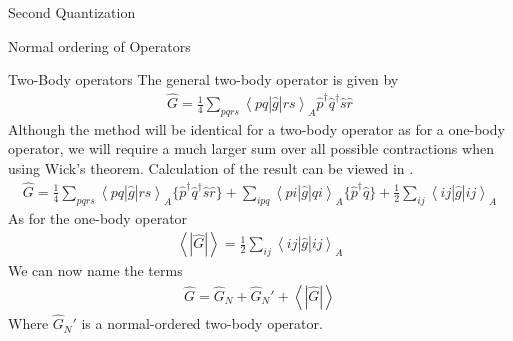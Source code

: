 \documentclass[twoside,english]{uiofysmaster}
\begin{document}
\begin{chapter}{Second Quantization}
\begin{section}{Normal ordering of Operators}
		\begin{subsection}{Two-Body operators}
			The general two-body operator is given by
			\begin{align}
				\hat G = \frac{1}{4} \sum_{pqrs} \left< pq | \hat g | rs \right>_A \hat p^\dagger \hat q^\dagger \hat s \hat r
			\end{align}
			Although the method will be identical for a two-body operator as for a one-body operator, we will require a much larger sum over all possible contractions when using Wick's theorem. Calculation of the result can be viewed in \cite{ShavittAndBartlett}. 
			\begin{align}
				\hat G = \frac{1}{4} \sum_{pqrs} \left<pq | \hat g | rs\right>_A \{ \hat p^\dagger \hat q^\dagger \hat s \hat r \}+ \sum_{ipq} \left<pi |\hat g | qi\right>_A \{ \hat p^\dagger \hat q\} + \frac{1}{2} \sum_{ij} \left< ij | \hat g | ij \right>_A 
				\label{Two-Body Normal Ordering}
			\end{align}
			As for the one-body operator
			\begin{align}
				\left< \right. | \hat G | \left.  \right> = \frac{1}{2} \sum_{ij} \left< ij | \hat g | ij \right>_A 
			\end{align}
			We can now name the terms 
			\begin{align}
				\hat G = \hat G_N + \hat G_N' + \left< \right. | \hat G | \left.  \right>
			\end{align}
			Where $\hat G_N'$ is a normal-ordered two-body operator. 

		\end{subsection}
	\end{section}


\end{chapter}
\end{document}
